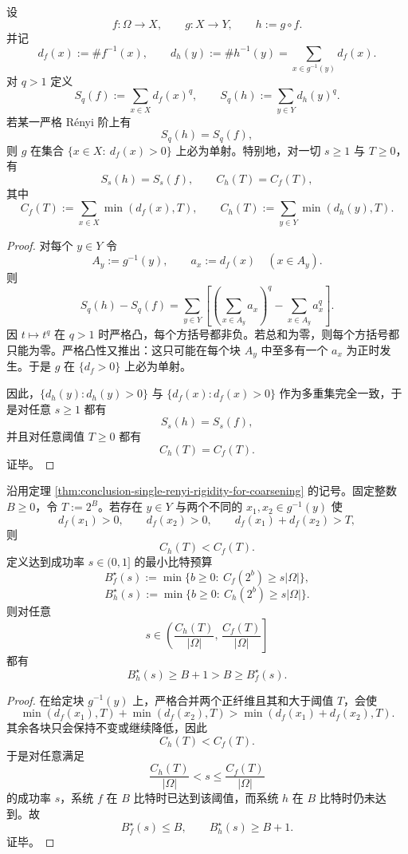\begin{theorem}\label{thm:conclusion-single-renyi-rigidity-for-coarsening}
设
\[
f:\Omega\to X,
\qquad
g:X\to Y,
\qquad
h:=g\circ f.
\]
并记
\[
d_f(x):=\#f^{-1}(x),
\qquad
d_h(y):=\#h^{-1}(y)=\sum_{x\in g^{-1}(y)}d_f(x).
\]
对 \(q>1\) 定义
\[
S_q(f):=\sum_{x\in X} d_f(x)^q,
\qquad
S_q(h):=\sum_{y\in Y} d_h(y)^q.
\]
若某一严格 Rényi 阶上有
\[
S_q(h)=S_q(f),
\]
则 \(g\) 在集合 \(\{x\in X:\ d_f(x)>0\}\) 上必为单射。特别地，对一切 \(s\ge 1\) 与 \(T\ge 0\)，有
\[
S_s(h)=S_s(f),
\qquad
C_h(T)=C_f(T),
\]
其中
\[
C_f(T):=\sum_{x\in X}\min(d_f(x),T),
\qquad
C_h(T):=\sum_{y\in Y}\min(d_h(y),T).
\]
\end{theorem}

\begin{proof}
对每个 \(y\in Y\) 令
\[
A_y:=g^{-1}(y),
\qquad
a_x:=d_f(x)\quad(x\in A_y).
\]
则
\[
S_q(h)-S_q(f)
=
\sum_{y\in Y}
\left[
\left(\sum_{x\in A_y}a_x\right)^q
-
\sum_{x\in A_y}a_x^q
\right].
\]
因 \(t\mapsto t^q\) 在 \(q>1\) 时严格凸，每个方括号都非负。若总和为零，则每个方括号都只能为零。严格凸性又推出：这只可能在每个块 \(A_y\) 中至多有一个 \(a_x\) 为正时发生。于是 \(g\) 在 \(\{d_f>0\}\) 上必为单射。

因此，\(\{d_h(y):d_h(y)>0\}\) 与 \(\{d_f(x):d_f(x)>0\}\) 作为多重集完全一致，于是对任意 \(s\ge 1\) 都有
\[
S_s(h)=S_s(f),
\]
并且对任意阈值 \(T\ge 0\) 都有
\[
C_h(T)=C_f(T).
\]
证毕。
\end{proof}

\begin{corollary}[严格粗化的精确位预算损失]\label{cor:conclusion-strict-coarsening-exact-bit-budget-loss}
沿用定理 \ref{thm:conclusion-single-renyi-rigidity-for-coarsening} 的记号。固定整数 \(B\ge 0\)，令 \(T:=2^B\)。若存在 \(y\in Y\) 与两个不同的 \(x_1,x_2\in g^{-1}(y)\) 使
\[
d_f(x_1)>0,
\qquad
d_f(x_2)>0,
\qquad
d_f(x_1)+d_f(x_2)>T,
\]
则
\[
C_h(T)<C_f(T).
\]
定义达到成功率 \(s\in(0,1]\) 的最小比特预算
\[
B_f^\star(s):=
\min\{b\ge 0:\ C_f(2^b)\ge s|\Omega|\},
\]
\[
B_h^\star(s):=
\min\{b\ge 0:\ C_h(2^b)\ge s|\Omega|\}.
\]
则对任意
\[
s\in\left(\frac{C_h(T)}{|\Omega|},\,\frac{C_f(T)}{|\Omega|}\right]
\]
都有
\[
B_h^\star(s)\ge B+1>B\ge B_f^\star(s).
\]
\end{corollary}

\begin{proof}
在给定块 \(g^{-1}(y)\) 上，严格合并两个正纤维且其和大于阈值 \(T\)，会使
\[
\min(d_f(x_1),T)+\min(d_f(x_2),T)
>
\min(d_f(x_1)+d_f(x_2),T).
\]
其余各块只会保持不变或继续降低，因此
\[
C_h(T)<C_f(T).
\]
于是对任意满足
\[
\frac{C_h(T)}{|\Omega|}< s\le \frac{C_f(T)}{|\Omega|}
\]
的成功率 \(s\)，系统 \(f\) 在 \(B\) 比特时已达到该阈值，而系统 \(h\) 在 \(B\) 比特时仍未达到。故
\[
B_f^\star(s)\le B,
\qquad
B_h^\star(s)\ge B+1.
\]
证毕。
\end{proof}

